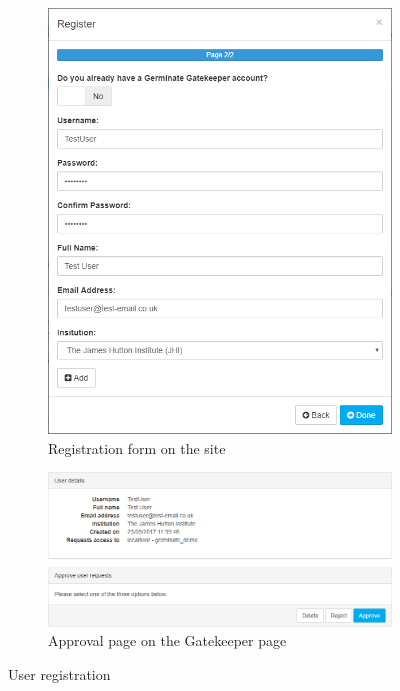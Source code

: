\begin{figure}
    \centering
    \begin{subfigure}[b]{0.375\textwidth}
        \centering
        \includegraphics[width=1.0\textwidth]{img/features/registration.png}
        \caption{Registration form on the {\germinate} site}
        \label{fig:user_registration_registration}
    \end{subfigure}
    \hspace*{0.5cm}
    \begin{subfigure}[b]{0.575\textwidth}
        \centering
        \includegraphics[width=1.0\textwidth]{img/features/registration-approve.png}
        \caption{Approval page on the Gatekeeper page}
        \label{fig:user_registration_approval}
    \end{subfigure}
    \caption{User registration}
    \label{fig:user_registration}
\end{figure}

